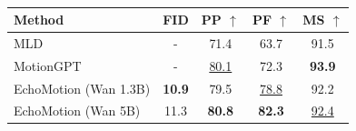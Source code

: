\begin{table}[t]
\centering
\caption{}
\label{tab:motion_generation_comparison}
\begin{tabular}{lcccc}
\toprule

\textbf{Method} & \textbf{FID}  & \textbf{PP} $\uparrow$ & \textbf{PF} $\uparrow$ & \textbf{MS} $\uparrow$ \\
\midrule
MLD & - & 71.4 & 63.7 & 91.5 \\
MotionGPT & - & \underline{80.1} & 72.3 & \textbf{93.9} \\
\midrule
EchoMotion (Wan 1.3B)  & \textbf{10.9} & 79.5 & \underline{78.8} & {92.2} \\
EchoMotion (Wan 5B)  & 11.3 & \textbf{80.8} & \textbf{82.3} & \underline{92.4} \\
\bottomrule
\end{tabular}
\end{table}